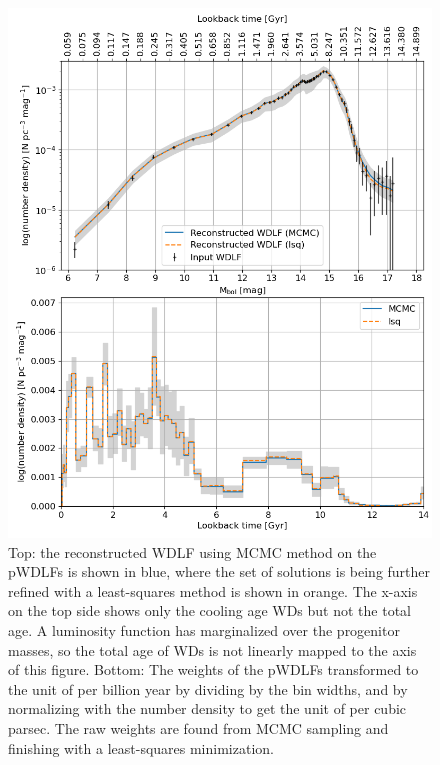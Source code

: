 \documentclass[fleqn,usenatbib]{mnras}
\begin{document}

\begin{figure}
    \includegraphics[width=
    \columnwidth]{figures/fig_05_gcns_reconstructed_wdlf_optimal_resolution_bin_optimal.png}
    \caption{Top: the reconstructed WDLF using MCMC method on the pWDLFs is
    shown in blue, where the set of solutions is being further refined with a
    least-squares method is shown in orange. The x-axis on the top side shows only the
    cooling age WDs but not the total age. A luminosity function has
    marginalized over the progenitor masses, so the total age of WDs is not
    linearly mapped to the axis of this figure. Bottom: The weights of the
    pWDLFs transformed to the unit of per billion year by dividing by the bin
    widths, and by normalizing with the number density to get the unit of per
    cubic parsec. The raw weights are found from MCMC sampling and finishing
    with a least-squares minimization.}
    \label{fig:sfh_optimal}
\end{figure}
\end{document}
